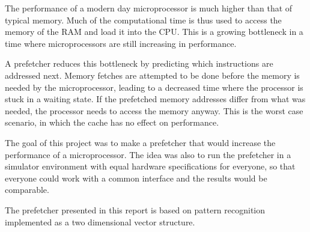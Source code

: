 The performance of a modern day microprocessor is much higher than that of typical memory. Much of the computational time is thus used to access the memory of the RAM and load it into the CPU. This is a growing bottleneck in a time where microprocessors are still increasing in performance. 

A prefetcher reduces this bottleneck by predicting which instructions are addressed next. Memory fetches are attempted to be done before the memory is needed by the microprocessor, leading to a decreased time where the processor is stuck in a waiting state. If the prefetched memory addresses differ from what was needed, the processor needs to access the memory anyway. This is the worst case scenario, in which the cache has no effect on performance.

The goal of this project was to make a prefetcher that would increase the performance of a microprocessor. The idea was also to run the prefetcher in a simulator environment with equal hardware specifications for everyone, so that everyone could work with a common interface and the results would be comparable. 

The prefetcher presented in this report is based on pattern recognition implemented as a two dimensional vector structure.